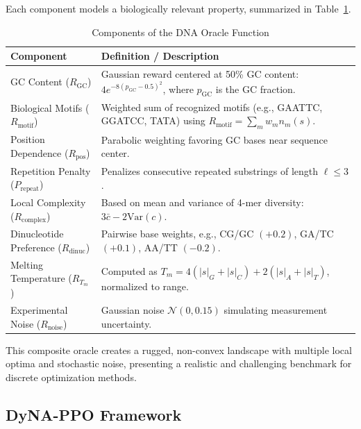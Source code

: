 \documentclass[conference]{IEEEtran}
\begin{document}
Each component models a biologically relevant property, summarized in Table~\ref{tab:oracle}.

\begin{table}[t] %
\centering
\caption{Components of the DNA Oracle Function}
\label{tab:oracle}
\begin{tabular}{p{4cm} p{11cm}} %
\toprule
\textbf{Component} & \textbf{Definition / Description} \\
\midrule
GC Content ($R_{\text{GC}}$) & Gaussian reward centered at 50\% GC content: 
$4 e^{-8(p_{\text{GC}}-0.5)^2}$, where $p_{\text{GC}}$ is the GC fraction. \\[4pt]
Biological Motifs ($R_{\text{motif}}$) & Weighted sum of recognized motifs (e.g., GAATTC, GGATCC, TATA) using $R_{\text{motif}} = \sum_{m} w_m n_m(s)$. \\[4pt]
Position Dependence ($R_{\text{pos}}$) & Parabolic weighting favoring GC bases near sequence center. \\[4pt]
Repetition Penalty ($P_{\text{repeat}}$) & Penalizes consecutive repeated substrings of length $\ell \le 3$. \\[4pt]
Local Complexity ($R_{\text{complex}}$) & Based on mean and variance of 4-mer diversity: $3\bar{c} - 2\text{Var}(c)$. \\[4pt]
Dinucleotide Preference ($R_{\text{dinuc}}$) & Pairwise base weights, e.g., CG/GC $(+0.2)$, GA/TC $(+0.1)$, AA/TT $(-0.2)$. \\[4pt]
Melting Temperature ($R_{T_m}$) & Computed as $T_m = 4(|s|_G + |s|_C) + 2(|s|_A + |s|_T)$, normalized to range. \\[4pt]
Experimental Noise ($R_{\text{noise}}$) & Gaussian noise $\mathcal{N}(0, 0.15)$ simulating measurement uncertainty. \\
\bottomrule
\end{tabular}
\end{table}

This composite oracle creates a rugged, non-convex landscape with multiple local optima and stochastic noise, presenting a realistic and challenging benchmark for discrete optimization methods.









\subsection{DyNA-PPO Framework}
\end{document}
